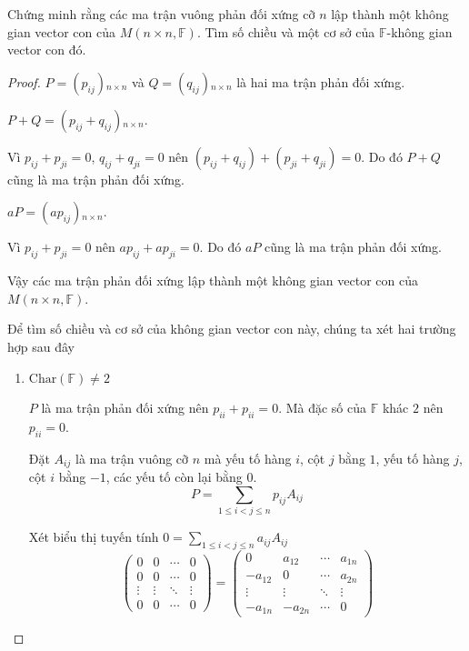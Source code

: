 \begin{exercise}\label{skew-symmetric-matrices}
    Chứng minh rằng các ma trận vuông phản đối xứng cỡ $n$ lập thành một không gian vector con của $M(n\times n,\mathbb{F})$. Tìm số chiều và một cơ sở của $\mathbb{F}$-không gian vector con đó.
\end{exercise}

\begin{proof}
    $P = (p_{ij}){}_{n\times n}$ và $Q = (q_{ij}){}_{n\times n}$ là hai ma trận phản đối xứng.
    
    $P + Q = (p_{ij} + q_{ij}){}_{n\times n}$.
    
    Vì $p_{ij} + p_{ji} = 0$, $q_{ij} + q_{ji} = 0$ nên $(p_{ij} + q_{ij}) + (p_{ji} + q_{ji}) = 0$. Do đó $P + Q$ cũng là ma trận phản đối xứng.
    
    $aP = (ap_{ij}){}_{n\times n}$.
    
    Vì $p_{ij} + p_{ji} = 0$ nên $ap_{ij} + ap_{ji} = 0$. Do đó $aP$ cũng là ma trận phản đối xứng.
    
    Vậy các ma trận phản đối xứng lập thành một không gian vector con của $M(n\times n,\mathbb{F})$.
    
    Để tìm số chiều và cơ sở của không gian vector con này, chúng ta xét hai trường hợp sau đây
    \begin{enumerate}[label={\textbf{Trường hợp \arabic*.}},itemindent=2cm]
        \item $\text{Char}(\mathbb{F})\ne 2$
              
              $P$ là ma trận phản đối xứng nên $p_{ii} + p_{ii} = 0$. Mà đặc số của $\mathbb{F}$ khác $2$ nên $p_{ii} = 0$.
              
              Đặt $A_{ij}$ là ma trận vuông cỡ $n$ mà yếu tố hàng $i$, cột $j$ bằng $1$, yếu tố hàng $j$, cột $i$ bằng $-1$, các yếu tố còn lại bằng $0$.
              \[ P = \sum_{1\le i < j \le n}p_{ij}A_{ij} \]
              
              Xét biểu thị tuyến tính $0 = \displaystyle\sum_{1\le i < j\le n}a_{ij}A_{ij}$
              \[
                  \begin{pmatrix}
                      0      & 0      & \cdots & 0      \\
                      0      & 0      & \cdots & 0      \\
                      \vdots & \vdots & \ddots & \vdots \\
                      0      & 0      & \cdots & 0
                  \end{pmatrix} =
                  \begin{pmatrix}
                      0       & a_{12}  & \cdots & a_{1n} \\
                      -a_{12} & 0       & \cdots & a_{2n} \\
                      \vdots  & \vdots  & \ddots & \vdots \\
                      -a_{1n} & -a_{2n} & \cdots & 0
                  \end{pmatrix}
              \]
              

\end{enumerate}
\end{proof}
